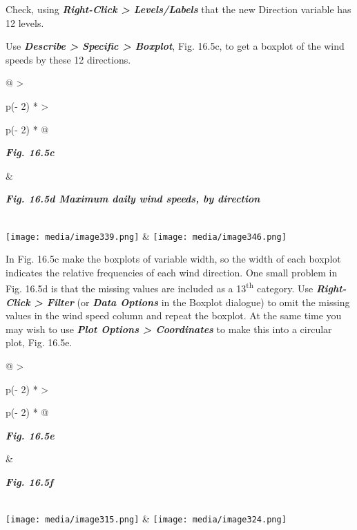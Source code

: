\documentclass[
  letterpaper,
  DIV=11,
  numbers=noendperiod]{scrreprt}
\begin{document}
Check, using \textbf{\emph{Right-Click \textgreater{} Levels/Labels}}
that the new Direction variable has 12 levels.

Use \textbf{\emph{Describe \textgreater{} Specific \textgreater{}
Boxplot}}, Fig. 16.5c, to get a boxplot of the wind speeds by these 12
directions.

\begin{longtable}[]{@{}
  >{\raggedright\arraybackslash}p{(\columnwidth - 2\tabcolsep) * }
  >{\raggedright\arraybackslash}p{(\columnwidth - 2\tabcolsep) * }@{}}
\toprule\noalign{}
\begin{minipage}[b]{\linewidth}\raggedright
\textbf{\emph{Fig. 16.5c}}
\end{minipage} & \begin{minipage}[b]{\linewidth}\raggedright
\textbf{\emph{Fig. 16.5d Maximum daily wind speeds, by direction}}
\end{minipage} \\
\midrule\noalign{}
\endhead
\bottomrule\noalign{}
\endlastfoot
\texttt{[image: media/image339.png]} &
\texttt{[image: media/image346.png]} \\
\end{longtable}

In Fig. 16.5c make the boxplots of variable width, so the width of each
boxplot indicates the relative frequencies of each wind direction. One
small problem in Fig. 16.5d is that the missing values are included as a
13\textsuperscript{th} category. Use \textbf{\emph{Right-Click
\textgreater{} Filter}} (or \textbf{\emph{Data Options}} in the Boxplot
dialogue) to omit the missing values in the wind speed column and repeat
the boxplot. At the same time you may wish to use \textbf{\emph{Plot
Options \textgreater{} Coordinates}} to make this into a circular plot,
Fig. 16.5e.

\begin{longtable}[]{@{}
  >{\raggedright\arraybackslash}p{(\columnwidth - 2\tabcolsep) * }
  >{\raggedright\arraybackslash}p{(\columnwidth - 2\tabcolsep) * }@{}}
\toprule\noalign{}
\begin{minipage}[b]{\linewidth}\raggedright
\textbf{\emph{Fig. 16.5e}}
\end{minipage} & \begin{minipage}[b]{\linewidth}\raggedright
\textbf{\emph{Fig. 16.5f}}
\end{minipage} \\
\midrule\noalign{}
\endhead
\bottomrule\noalign{}
\endlastfoot
\texttt{[image: media/image315.png]} &
\texttt{[image: media/image324.png]} \\
\end{longtable}
\end{document}
